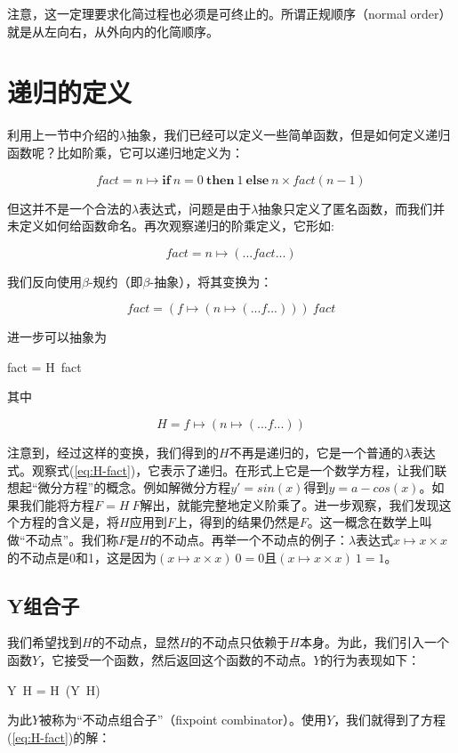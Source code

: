 \documentclass[b5paper]{ctexart}
\begin{document}
注意，这一定理要求化简过程也必须是可终止的。所谓正规顺序（normal order）就是从左向右，从外向内的化简顺序。

\section{递归的定义}

利用上一节中介绍的$\lambda$抽象，我们已经可以定义一些简单函数，但是如何定义递归函数呢？比如阶乘，它可以递归地定义为：

\[
fact = n \mapsto \textbf{if}\ n = 0\ \textbf{then}\ 1\ \textbf{else}\ n \times fact (n - 1)
\]

但这并不是一个合法的$\lambda$表达式，问题是由于$\lambda$抽象只定义了匿名函数，而我们并未定义如何给函数命名。再次观察递归的阶乘定义，它形如:

\[
fact = n \mapsto (... fact ...)
\]

我们反向使用$\beta$-规约（即$\beta$-抽象），将其变换为：

\[
fact = (f \mapsto (n \mapsto (... f ...)))\ fact
\]

进一步可以抽象为

\be
fact = H\ fact
\label{eq:H-fact}
\ee

其中

\[
H = f \mapsto (n \mapsto (... f ...))
\]

注意到，经过这样的变换，我们得到的$H$不再是递归的，它是一个普通的$\lambda$表达式。观察式(\ref{eq:H-fact})，它表示了递归。在形式上它是一个数学方程，让我们联想起“微分方程”的概念。例如解微分方程$y' = sin(x)$得到$y = a - cos(x)$。如果我们能将方程$F = H\ F$解出，就能完整地定义阶乘了。进一步观察，我们发现这个方程的含义是，将$H$应用到$F$上，得到的结果仍然是$F$。这一概念在数学上叫做“不动点”。我们称$F$是$H$的不动点。再举一个不动点的例子：$\lambda$表达式$x \mapsto x \times x$的不动点是0和1，这是因为$(x \mapsto x \times x)\ 0 = 0$且$(x \mapsto x \times x)\ 1 = 1$。

\subsection{Y组合子}
我们希望找到$H$的不动点，显然$H$的不动点只依赖于$H$本身。为此，我们引入一个函数$Y$，它接受一个函数，然后返回这个函数的不动点。$Y$的行为表现如下：

\be
Y\ H = H\ (Y\ H)
\label{eq:Y-H}
\ee

为此$Y$被称为“不动点组合子”（fixpoint combinator）。使用$Y$，我们就得到了方程(\ref{eq:H-fact})的解：
\end{document}
